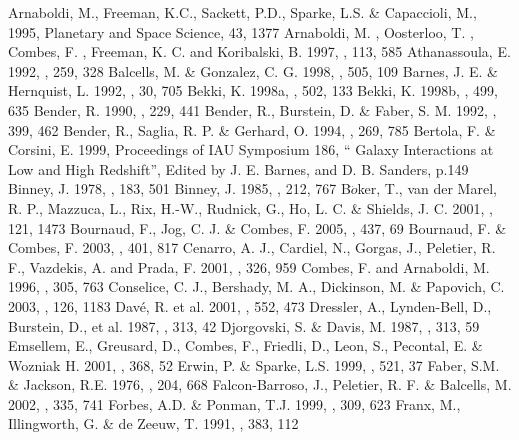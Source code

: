 \documentclass[12pt,preprint]{aastex}
\begin{document}
\begin{thebibliography}{}
 Arnaboldi, M., Freeman, K.C., Sackett, P.D., Sparke, L.S. \& Capaccioli, M., 1995, Planetary and Space Science, 43, 1377
 Arnaboldi, M. , Oosterloo, T. , Combes, F. , Freeman, K. C. and Koribalski, B. 1997, \aj, 113, 585
 Athanassoula, E. 1992, \mnras, 259, 328
 Balcells, M.  \& Gonzalez, C. G. 1998, \apjl, 505, 109
 Barnes, J. E. \& Hernquist, L. 1992, \araa, 30, 705
 Bekki, K. 1998a, \apjl, 502, 133
 Bekki, K. 1998b, \apj, 499, 635
 Bender, R. 1990, \aap, 229, 441
 Bender, R., Burstein, D. \& Faber, S. M. 1992, \apj, 399, 462
 Bender, R., Saglia, R. P. \& Gerhard, O. 1994, \mnras, 269, 785
 Bertola, F. \& Corsini, E. 1999, Proceedings of IAU Symposium 186, `` Galaxy Interactions at Low and High Redshift'', Edited by J. E. Barnes, and D. B. Sanders, p.149
 Binney, J. 1978, \mnras, 183, 501
 Binney, J. 1985, \mnras, 212, 767
 B$\ddot{o}$ker, T., van der Marel, R. P., Mazzuca, L., Rix, H.-W., Rudnick, G., Ho, L. C. \& Shields, J. C.  2001, \aj, 121, 1473
 Bournaud, F., Jog, C. J. \& Combes, F. 2005, \aap, 437, 69
 Bournaud, F. \& Combes, F. 2003, \aap, 401, 817
 Cenarro, A. J., Cardiel, N., Gorgas, J., Peletier, R. F., Vazdekis, A. and Prada, F. 2001, \mnras, 326, 959
 Combes, F. and Arnaboldi, M. 1996, \aap, 305, 763
 Conselice, C. J., Bershady, M. A., Dickinson, M. \& Papovich, C. 2003, \aj, 126, 1183
 Dav\'e, R. et al. 2001, \apj, 552, 473 
 Dressler, A., Lynden-Bell, D., Burstein, D., et al. 1987, \apj, 313, 42 
 Djorgovski, S. \& Davis, M. 1987, \apj, 313, 59
 Emsellem, E., Greusard, D., Combes, F., Friedli, D., Leon, S., Pecontal, E. \& Wozniak H. 2001, \aap, 368, 52
 Erwin, P. \& Sparke, L.S. 1999, \apjl, 521, 37
 Faber, S.M. \& Jackson, R.E. 1976, \apj, 204, 668
 Falcon-Barroso, J., Peletier, R. F. \& Balcells, M. 2002, \mnras, 335, 741
 Forbes, A.D. \& Ponman, T.J. 1999, \mnras, 309, 623
 Franx, M., Illingworth, G. \& de Zeeuw, T. 1991, \apj, 383, 112

\end{thebibliography}
\end{document}

